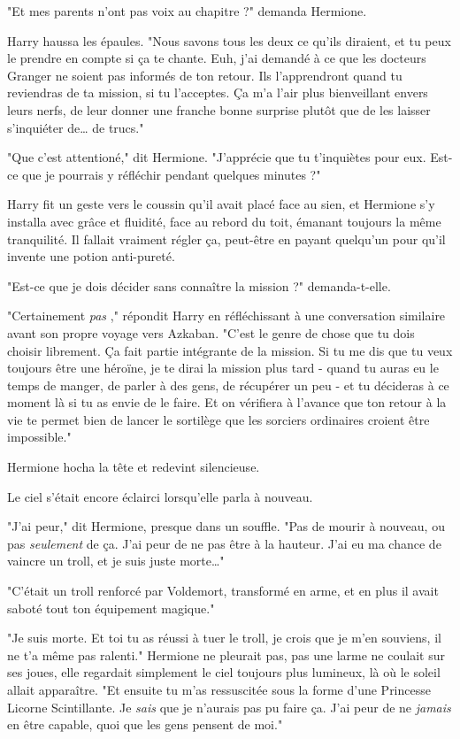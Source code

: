 "Et mes parents n'ont pas voix au chapitre ?" demanda Hermione.

Harry haussa les épaules. "Nous savons tous les deux ce qu'ils diraient, et tu peux le prendre en compte si ça te chante. Euh, j'ai demandé à ce que les docteurs Granger ne soient pas informés de ton retour. Ils l'apprendront quand tu reviendras de ta mission, si tu l'acceptes. Ça m'a l'air plus bienveillant envers leurs nerfs, de leur donner une franche bonne surprise plutôt que de les laisser s'inquiéter de… de trucs."

"Que c'est attentioné," dit Hermione. "J'apprécie que tu t'inquiètes pour eux. Est-ce que je pourrais y réfléchir pendant quelques minutes ?"

Harry fit un geste vers le coussin qu'il avait placé face au sien, et Hermione s'y installa avec grâce et fluidité, face au rebord du toit, émanant toujours la même tranquilité. Il fallait vraiment régler ça, peut-être en payant quelqu'un pour qu'il invente une potion anti-pureté.

"Est-ce que je dois décider sans connaître la mission ?" demanda-t-elle.

"Certainement \emph{pas} ," répondit Harry en réfléchissant à une conversation similaire avant son propre voyage vers Azkaban. "C'est le genre de chose que tu dois choisir librement. Ça fait partie intégrante de la mission. Si tu me dis que tu veux toujours être une héroïne, je te dirai la mission plus tard - quand tu auras eu le temps de manger, de parler à des gens, de récupérer un peu - et tu décideras à ce moment là si tu as envie de le faire. Et on vérifiera à l'avance que ton retour à la vie te permet bien de lancer le sortilège que les sorciers ordinaires croient être impossible."

Hermione hocha la tête et redevint silencieuse.

Le ciel s'était encore éclairci lorsqu'elle parla à nouveau.

"J'ai peur," dit Hermione, presque dans un souffle. "Pas de mourir à nouveau, ou pas \emph{seulement}  de ça. J'ai peur de ne pas être à la hauteur. J'ai eu ma chance de vaincre un troll, et je suis juste morte…"

"C'était un troll renforcé par Voldemort, transformé en arme, et en plus il avait saboté tout ton équipement magique."

"Je suis morte. Et toi tu as réussi à tuer le troll, je crois que je m'en souviens, il ne t'a même pas ralenti." Hermione ne pleurait pas, pas une larme ne coulait sur ses joues, elle regardait simplement le ciel toujours plus lumineux, là où le soleil allait apparaître. "Et ensuite tu m'as ressuscitée sous la forme d'une Princesse Licorne Scintillante. Je \emph{sais}  que je n'aurais pas pu faire ça. J'ai peur de ne \emph{jamais}  en être capable, quoi que les gens pensent de moi."

